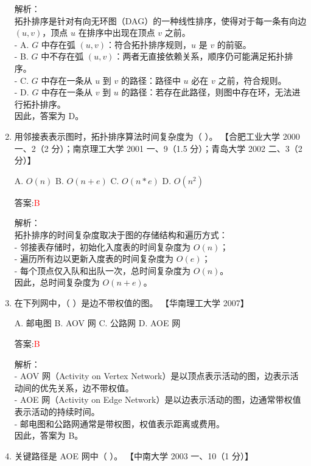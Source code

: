 \documentclass[lang=cn,newtx,10pt,scheme=chinese]{../../../elegantbook}
\begin{document}
\begin{enumerate}
    解析：\\
    拓扑排序是针对有向无环图（DAG）的一种线性排序，使得对于每一条有向边 $(u, v)$，顶点 $u$ 在排序中出现在顶点 $v$ 之前。\\
    - A. $G$ 中存在弧 $(u, v)$：符合拓扑排序规则，$u$ 是 $v$ 的前驱。\\
    - B. $G$ 中不存在弧 $(u, v)$：两者无直接依赖关系，顺序仍可能满足拓扑排序。\\
    - C. $G$ 中存在一条从 $u$ 到 $v$ 的路径：路径中 $u$ 必在 $v$ 之前，符合规则。\\
    - D. $G$ 中存在一条从 $v$ 到 $u$ 的路径：若存在此路径，则图中存在环，无法进行拓扑排序。\\
    因此，答案为 D。

\item 用邻接表表示图时，拓扑排序算法时间复杂度为（ ）。  
    【合肥工业大学 2000 一、2（2 分）；南京理工大学 2001 一、9（1.5 分）；青岛大学 2002 二、3（2 分）】 

    A. $O(n)$ \quad B. $O(n+e)$ \quad C. $O(n*e)$ \quad D. $O(n^2)$  

    答案:\textcolor{red}{B}

    解析：\\
    拓扑排序的时间复杂度取决于图的存储结构和遍历方式：\\
    - 邻接表存储时，初始化入度表的时间复杂度为 $O(n)$；\\
    - 遍历所有边以更新入度表的时间复杂度为 $O(e)$；\\
    - 每个顶点仅入队和出队一次，总时间复杂度为 $O(n)$。\\
    因此，总时间复杂度为 $O(n + e)$。

\item 在下列网中，（ ）是边不带权值的图。  
    【华南理工大学 2007】  

    A. 邮电图 \quad B. AOV 网 \quad C. 公路网 \quad D. AOE 网  

    答案:\textcolor{red}{B}

    解析：\\
    - AOV 网（Activity on Vertex Network）是以顶点表示活动的图，边表示活动间的优先关系，边不带权值。\\
    - AOE 网（Activity on Edge Network）是以边表示活动的图，边通常带权值表示活动的持续时间。\\
    - 邮电图和公路网通常是带权图，权值表示距离或费用。\\
    因此，答案为 B。

\item 关键路径是 AOE 网中（ ）。  
    【中南大学 2003 一、10（1 分）】  


\end{enumerate}
\end{document}
